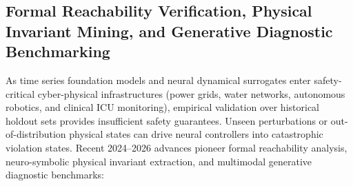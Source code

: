 \subsection{Formal Reachability Verification, Physical Invariant Mining, and Generative Diagnostic Benchmarking}
\label{sec:formal_reachability_invariants_timera}

As time series foundation models and neural dynamical surrogates enter safety-critical cyber-physical infrastructures (power grids, water networks, autonomous robotics, and clinical ICU monitoring), empirical validation over historical holdout sets provides insufficient safety guarantees. Unseen perturbations or out-of-distribution physical states can drive neural controllers into catastrophic violation states. Recent 2024--2026 advances pioneer formal reachability analysis, neuro-symbolic physical invariant extraction, and multimodal generative diagnostic benchmarks:

